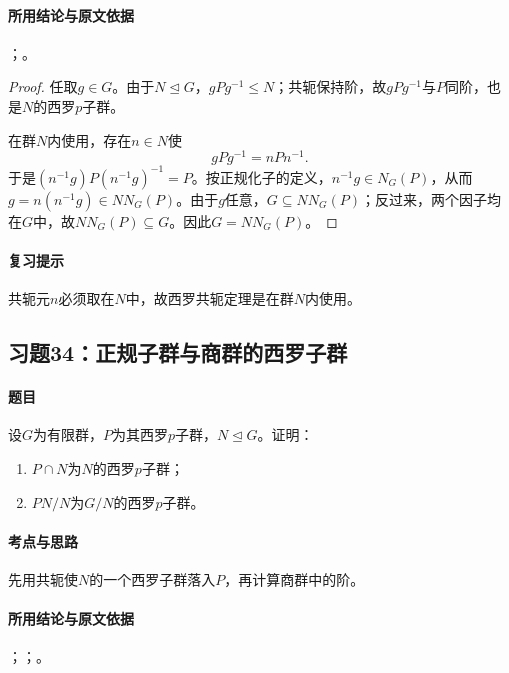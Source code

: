 \paragraph{所用结论与原文依据}
；。


\begin{proof}
任取$g\in G$。由于$N\trianglelefteq G$，$gPg^{-1}\leq N$；共轭保持阶，故$gPg^{-1}$与$P$同阶，也是$N$的西罗$p$子群。

在群$N$内使用，存在$n\in N$使
\[
gPg^{-1}=nPn^{-1}.
\]
于是$(n^{-1}g)P(n^{-1}g)^{-1}=P$。按正规化子的定义，$n^{-1}g\in N_G(P)$，从而$g=n(n^{-1}g)\in NN_G(P)$。由于$g$任意，$G\subseteq NN_G(P)$；反过来，两个因子均在$G$中，故$NN_G(P)\subseteq G$。因此$G=NN_G(P)$。
\end{proof}

\paragraph{复习提示}
共轭元$n$必须取在$N$中，故西罗共轭定理是在群$N$内使用。


\subsection{习题34：\texorpdfstring{正规子群与商群的西罗子群}{正规子群与商群的西罗子群}}
\label{ex:2:34}

\paragraph{题目}
设$G$为有限群，$P$为其西罗$p$子群，$N\trianglelefteq G$。证明：
\begin{enumerate}
\item $P\cap N$为$N$的西罗$p$子群；
\item $PN/N$为$G/N$的西罗$p$子群。
\end{enumerate}

\paragraph{考点与思路}
先用共轭使$N$的一个西罗子群落入$P$，再计算商群中的阶。

\paragraph{所用结论与原文依据}
；；。


